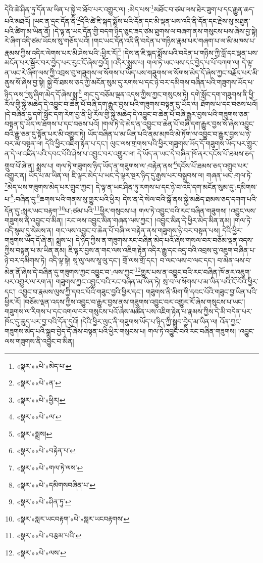 དེའི་ཚེ་ཤིན་ཏུ་དོན་མ་ཡིན་པ་སྐྱེ་བ་ཐོབ་པར་འགྱུར་ལ། :མེད་པས་\footnote{«སྣར་»«པེ་»མེད་པ་}མཐོང་བ་ཙམ་ལས་ཐེར་ཟུག་པ་དང་རྒྱུན་ཆད་པའི་མཐའོ། །ཡང་ན་དྲང་དོན་ནི་\footnote{«སྣར་»«པེ་»ན་}དེའི་ཚེ་ཇི་སྐད་སྨོས་པའི་དོན་དང་མི་ལྡན་པས་འདི་ནི་དོན་དང་རྗེས་སུ་མཐུན་པའི་ཚིག་མ་ཡིན་ནོ། །དེ་ལྟ་ན་ཡང་དོན་གྱི་བདག་ཉིད་ཅུང་ཟད་ཙམ་ཐུགས་ལ་བཞག་ནས་གསུངས་པས་ཞེས་བྱ་སྟེ། རེ་ཞིག་འདི་ཙམ་ཡོངས་སུ་གཅོད་པའོ། །གང་ཡང་དོན་འདི་ནི་བདེན་པ་གཉིས་རྣམ་པར་གཞག་པ་ལ་མི་མཁས་པ་རྣམས་ཀྱིས་འདིར་ལེགས་པར་མི་ཤེས་པའི་:ཕྱིར་རོ།\footnote{«སྣར་»«པེ་»ཕྱིར།} །དེས་ན་ཇི་སྐད་སྨོས་པའི་བདེན་པ་གཉིས་ཀྱི་བློ་དང་ལྡན་པས་མངོན་པར་སྦྱོར་བར་བྱེད་པར་རུང་ངོ་ཞེས་བྱའོ། །འདིར་སྨྲས་པ། གལ་ཏེ་ཡང་ལས་དང་བྱེད་པ་པོ་བཀག་ལ། དེ་ལྟ་ན་ཡང་རེ་ཞིག་ལས་ཀྱི་འབྲས་བུ་གཟུགས་ལ་སོགས་པ་ཡོད་པས་གཟུགས་ལ་སོགས་མེད་དོ་ཞེས་ཀྱང་བརྗོད་པར་མི་ནུས་སོ་ཞེས་བྱ་སྟེ། སྐྱེ་བོ་ཐམས་ཅད་ཀྱི་མངོན་སུམ་དུ་རགས་པ་དང་ཉེ་བར་དམིགས་བཞིན་པའི་གཟུགས་ཡོད་པ་ཉིད་ལས་\footnote{«སྣར་»«པེ་»ལ་}སུ་ཞིག་མེད་དོ་ཞེས་སྨྲ།\footnote{«སྣར་»སྨྲས།} གང་དུ་བཅོམ་ལྡན་འདས་ཀྱིས་ཀྱང་གསུངས་ཏེ། དགེ་སློང་དག་གཟུགས་ནི་ཕྱི་རོལ་གྱི་སྐྱེ་མཆེད་དེ་འབྱུང་བ་ཆེན་པོ་བཞི་དག་རྒྱུར་བྱས་པའི་གཟུགས་བསྟན་དུ་ཡོད་ལ། ཐོགས་པ་དང་བཅས་པའོ། །དེ་བཞིན་དུ་དགེ་སློང་དག་རེག་བྱ་ནི་ཕྱི་རོལ་གྱི་སྐྱེ་མཆེད་དེ་འབྱུང་བ་ཆེན་པོ་བཞི་རྒྱུར་བྱས་པའི་གཟུགས་ཅན་བསྟན་དུ་ཡོད་ལ་ཐོགས་པ་དང་བཅས་པའོ། །གལ་ཏེ་དེ་མེད་ན་འབྱུང་བ་ཆེན་པོ་བཞི་དག་རྒྱུར་བྱས་སོ་ཞེས་འབྱུང་བའི་རྒྱུ་ཅན་དུ་སྟོན་པར་མི་འགྱུར་ཏེ། ཡོད་བཞིན་པ་མ་ཡིན་པའི་ནམ་མཁའི་མེ་ཏོག་ལ་འབྱུང་བ་རྒྱུར་བྱས་པ་ཉེ་བར་མ་བསྟན་ལ། དེའི་ཕྱིར་འཇིག་རྟེན་པ་དང་། ལུང་ལས་གྲགས་པའི་ཕྱིར་གཟུགས་ཡོད་དོ་གཟུགས་ཡོད་པར་གྱུར་ན་དེ་ལ་འཛིན་པའི་དབང་པོའི་ཤེས་པ་འབྱུང་བར་འགྱུར་ལ། དེ་ཡོད་ན་ཡང་དེ་བཞིན་ཁོ་ནར་དངོས་པོ་ཐམས་ཅད་གྲུབ་པོ་ཞེ་ན། སྨྲས་པ། གལ་ཏེ་གཟུགས་ཉིད་ཡོད་ན་གཟུགས་ལ་:བརྟེན་ནས་\footnote{«སྣར་»«པེ་»བརྟེན་པ་}དངོས་པོ་ཐམས་ཅད་འགྲུབ་པར་འགྱུར་ན། ཡོད་པ་མ་ཡིན་ལ། ཇི་ལྟར་མེད་པ་ཡང་དེ་ལྟར་སྔར་ཉིད་དུ་རྒྱས་པར་བསྒྲུབས་ལ། གཞན་ཡང་:གལ་ཏེ་\footnote{«སྣར་»«པེ་»གལ་ཏེ་ལས་}མེད་པས་གཟུགས་མེད་པར་གྲུབ་ཀྱང་། དེ་ལྟ་ན་ཡང་ཤིན་ཏུ་རགས་པ་དང་ཉེ་བ་འདི་དག་མངོན་སུམ་དུ་:དམིགས་པ་\footnote{«སྣར་»«པེ་»དམིགསབཞིན་པ་}:བཞིན་དུ་\footnote{«སྣར་»«པེ་»ཤིན་ཏུ་}ཆགས་པའི་གནས་སུ་གྱུར་པའི་ཕྱིར། དེས་ན་དེ་སེལ་བའི་སྒོ་ནས་སྐྱེ་མཆེད་ཐམས་ཅད་དགག་པའི་དོན་དུ་:སླར་ཡང་བརྟག་\footnote{«སྣར་»སླར་ཡངབརྟག་«པེ་»སླར་ཡངབརྟགས་}པ་:ཙམ་པའི་\footnote{«སྣར་»«པེ་»བརྩམ་པའི་}ཕྱིར་གསུངས་པ། གལ་ཏེ་འབྱུང་བའི་རང་བཞིན་གཟུགས། །འབྱུང་ལས་གཟུགས་ནི་འབྱུང་བ་མིན། །རང་ལས་འབྱུང་མིན་གཞན་ལས་ཀྱང་། །འབྱུང་མིན་དེ་ཕྱིར་མེད་མིན་ནམ། །གལ་ཏེ་འདི་སྙམ་དུ་སེམས་ན། གང་ལས་འབྱུང་བ་ཆེན་པོ་བཞི་ལ་བརྟེན་ནས་གཟུགས་ཉེ་བར་བསྟན་པས། དེའི་ཕྱིར་གཟུགས་ཡོད་དོ་ཞེ་ན། སྨྲས་པ། དེ་ཉིད་ཀྱིས་ན་གཟུགས་རང་བཞིན་མེད་པའོ་ཞེས་གསལ་བར་བཅོམ་ལྡན་འདས་ཀྱིས་བསྟན་པ་མ་ཡིན་ནམ། ཇི་ལྟར་བྱས་ན་གང་ལས་འཇིག་རྟེན་འདིར་རྒྱུ་དང་འདྲ་བའི་འབྲས་བུ་འཇུག་བཞིན་པ་ཉེ་བར་དམིགས་ཏེ། འདི་ལྟ་སྟེ། སཱ་ལུ་ལས་སཱ་ལུ་དང་། གྲོ་ལས་གྲོ་དང་། བ་ལང་ལས་བ་ལང་དང་། བ་མེན་ལས་བ་མེན་ནོ་ཞེས་དེ་བཞིན་དུ་གཟུགས་ཀྱང་འབྱུང་བ་:ལས་ཀྱང་\footnote{«སྣར་»«པེ་»ལས་}གྱུར་པས་ན་འབྱུང་བའི་རང་བཞིན་ཁོ་ནར་འཇུག་པར་འགྱུར་ལ་རག་ན། གཟུགས་ཀྱང་འབྱུང་བའི་རང་བཞིན་མ་ཡིན་ཏེ། སྲ་བ་ལ་སོགས་པ་མ་ཡིན་པའི་ངོ་བོའི་ཕྱིར་དང་། འབྱུང་བ་རྣམས་ལུས་ཀྱི་དབང་པོའི་གཟུང་བྱའི་ཕྱིར་དང་། གཟུགས་ནི་མིག་གི་དབང་པོའི་གཟུང་བྱ་ཡིན་པའི་ཕྱིར་རོ། །བཅོམ་ལྡན་འདས་ཀྱིས་འབྱུང་བ་རྒྱུར་བྱས་ནས་གཟུགས་འབྱུང་བར་འགྱུར་རོ་ཞེས་གསུངས་པ་ཡང་། གཟུགས་ལ་རིགས་པ་དང་འགལ་བར་གསུངས་པའོ་ཞེས་མཚོན་པས་འཇིག་རྟེན་པ་རྣམས་ཀྱིས་དེ་མི་བདེན་པར་ཁོང་དུ་ཆུད་པར་བྱ་བའི་དོན་དུའོ། །དེའི་ཕྱིར་ལུང་ནི་གཟུགས་ཡོད་པ་ཉིད་ཀྱི་སྒྲུབ་བྱེད་མ་ཡིན་ལ། འོན་ཀྱང་གཟུགས་མེད་པའི་སྒྲུབ་བྱེད་དོ་ཞེས་བསྟན་པའི་ཕྱིར་གསུངས་པ། གལ་ཏེ་འབྱུང་བའི་རང་བཞིན་གཟུགས། །འབྱུང་ལས་གཟུགས་ནི་འབྱུང་བ་མིན། 